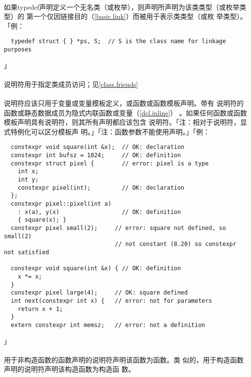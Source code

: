 \paragraph{}
如果typedef声明定义一个无名类（或枚举），则声明所声明为该类类型（或枚举类型）的
第一个仅因链接目的（\ref{basic.link}）而被用于表示类类型（或枚
举类型）。「例：
\begin{lstlisting}
  typedef struct { } *ps, S;  // S is the class name for linkage purposes
\end{lstlisting}」

\paragraph{}
说明符用于指定类成员访问；见\ref{class.friends}

\paragraph{}
说明符应该只用于变量或变量模板定义，或函数或函数模板声明。带有
说明符的函数或静态数据成员为隐式内联函数或变量（\ref{dcl.inline}）
。如果任何函数或函数模板声明具有说明符，则其所有声明都应该包含
说明符。「注：相对于说明符，显式特例化可以区分模板声
明。」「注：函数参数不能使用声明。」「例：
\begin{lstlisting}
  constexpr void square(int &x);  // OK: declaration
  constexpr int bufsz = 1024;     // OK: definition
  constexpr struct pixel {        // error: pixel is a type
    int x;
    int y;
    constexpr pixel(int);         // OK: declaration
  };
  constexpr pixel::pixel(int a)
    : x(a), y(x)                  // OK: definition
    { square(x); }
  constexpr pixel small(2);     // error: square not defined, so small(2)
                                // not constant (8.20) so constexpr not satisfied

  constexpr void square(int &x) { // OK: definition
    x *= x;
  }
  constexpr pixel large(4);     // OK: square defined
  int next(constexpr int x) {   // error: not for parameters
    return x + 1;
  }
  extern constexpr int memsz;   // error: not a definition
\end{lstlisting}」

\paragraph{}
用于非构造函数的函数声明的说明符声明该函数为函数。类
似的，用于构造函数声明的说明符声明该构造函数为构造函
数。

